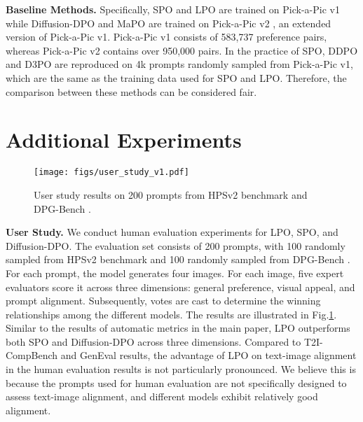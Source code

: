 \textbf{Baseline Methods.} Specifically, SPO and LPO are trained on Pick-a-Pic v1 \cite{pickscore} while Diffusion-DPO and MaPO are trained on Pick-a-Pic v2 \cite{pickscore}, an extended version of Pick-a-Pic v1. Pick-a-Pic v1 consists of 583,737 preference pairs, whereas Pick-a-Pic v2 contains over 950,000 pairs. In the practice of SPO, DDPO \cite{ddpo} and D3PO \cite{d3po} are reproduced on 4k prompts randomly sampled from Pick-a-Pic v1, which are the same as the training data used for SPO and LPO. Therefore, the comparison between these methods can be considered fair.


\section{Additional Experiments}
\label{sec:add_exp}

\begin{figure}[ht]
    \centering
    \texttt{[image: figs/user\_study\_v1.pdf]}
    \vspace{-20pt}
    \caption{User study results on 200 prompts from HPSv2 benchmark \cite{hpsv2} and DPG-Bench \cite{dpg_bench}.}
    \label{fig:user_study}
\end{figure}

\textbf{User Study.} We conduct human evaluation experiments for LPO, SPO, and Diffusion-DPO. The evaluation set consists of 200 prompts, with 100 randomly sampled from HPSv2 benchmark \cite{hpsv2} and 100 randomly sampled from DPG-Bench \cite{dpg_bench}. For each prompt, the model generates four images. For each image, five expert evaluators score it across three dimensions: general preference, visual appeal, and prompt alignment. Subsequently, votes are cast to determine the winning relationships among the different models. The results are illustrated in Fig.\;\ref{fig:user_study}. Similar to the results of automatic metrics in the main paper, LPO outperforms both SPO and Diffusion-DPO across three dimensions. Compared to T2I-CompBench and GenEval results, the advantage of LPO on text-image alignment in the human evaluation results is not particularly pronounced. We believe this is because the prompts used for human evaluation are not specifically designed to assess text-image alignment, and different models exhibit relatively good alignment.

